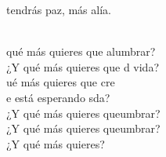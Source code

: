 \documentclass[12pt]{article}
\begin{document}
\begin{multicols*}{2}
\begin{cancion}
	tendrás paz, más alía.\\\jump\\
	\begin{chorus}%
	 qué más quieres que alumbrar?\\
	¿Y qué más quieres que d vida?\\
	ué más quieres que cre \\
	e está esperando sda?\\
	¿Y qué más quieres queumbrar?\\
	¿Y qué más quieres queumbrar?\\
¿Y qué más quieres?\\
	\end{chorus}%
	\jump\\
\end{cancion}%


\end{multicols*}
\end{document}

